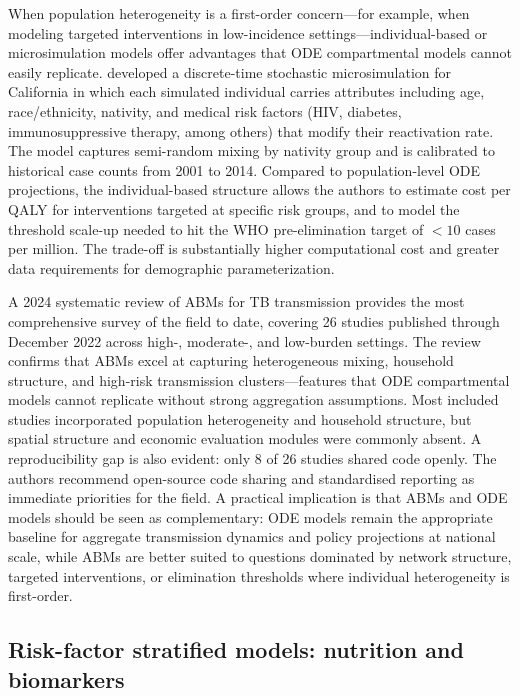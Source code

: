 \documentclass[11pt]{article}
\begin{document}
When population heterogeneity is a first-order concern---for example, when modeling targeted interventions in low-incidence settings---individual-based or microsimulation models offer advantages that ODE compartmental models cannot easily replicate. \citet{goodell2019california} developed a discrete-time stochastic microsimulation for California in which each simulated individual carries attributes including age, race/ethnicity, nativity, and medical risk factors (HIV, diabetes, immunosuppressive therapy, among others) that modify their reactivation rate. The model captures semi-random mixing by nativity group and is calibrated to historical case counts from 2001 to 2014. Compared to population-level ODE projections, the individual-based structure allows the authors to estimate cost per QALY for interventions targeted at specific risk groups, and to model the threshold scale-up needed to hit the WHO pre-elimination target of $<10$ cases per million. The trade-off is substantially higher computational cost and greater data requirements for demographic parameterization.

A 2024 systematic review of ABMs for TB transmission \citep{bui2024agentbased} provides the most comprehensive survey of the field to date, covering 26 studies published through December 2022 across high-, moderate-, and low-burden settings. The review confirms that ABMs excel at capturing heterogeneous mixing, household structure, and high-risk transmission clusters---features that ODE compartmental models cannot replicate without strong aggregation assumptions. Most included studies incorporated population heterogeneity and household structure, but spatial structure and economic evaluation modules were commonly absent. A reproducibility gap is also evident: only 8 of 26 studies shared code openly. The authors recommend open-source code sharing and standardised reporting as immediate priorities for the field. A practical implication is that ABMs and ODE models should be seen as complementary: ODE models remain the appropriate baseline for aggregate transmission dynamics and policy projections at national scale, while ABMs are better suited to questions dominated by network structure, targeted interventions, or elimination thresholds where individual heterogeneity is first-order.

\subsection{Risk-factor stratified models: nutrition and biomarkers}
\label{sec:modeling_extensions}
\end{document}

